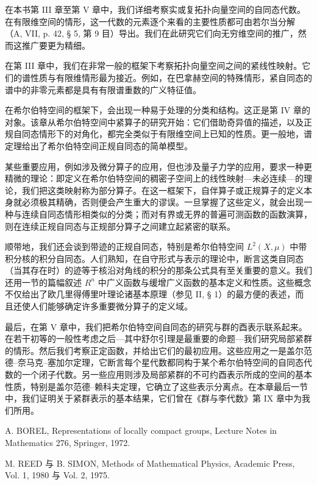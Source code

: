 
在本书第 III 章至第 V 章中，我们详细考察实或复拓扑向量空间的自同态代数。在有限维空间的情形，这一代数的元素逐个来看的主要性质都可由若尔当分解（A, VII, p. 42, § 5, 第 9 目）导出。我们在此研究它们向无穷维空间的推广，然而这推广要更为精细。

在第 III 章中，我们在非常一般的框架下考察拓扑向量空间之间的紧线性映射。它们的谱性质与有限维情形最为接近。例如，在巴拿赫空间的特殊情形，紧自同态的谱中的非零元素都是具有有限谱重数的广义特征值。

在希尔伯特空间的框架下，会出现一种易于处理的分类和结构。这正是第 IV 章的对象。该章从希尔伯特空间中紧算子的研究开始：它们借助奇异值的描述，以及正规自同态情形下的对角化，都完全类似于有限维空间上已知的性质。更一般地，谱定理给出了希尔伯特空间正规自同态的简单模型。

某些重要应用，例如涉及微分算子的应用，但也涉及量子力学的应用，要求一种更精微的理论：即定义在希尔伯特空间的稠密子空间上的线性映射---未必连续---的理论，我们把这类映射称为部分算子。在这一框架下，自伴算子或正规算子的定义本身就必须极其精确，否则便会产生重大的谬误。一旦掌握了这些定义，就会出现一种与连续自同态情形相类似的分类；而对有界或无界的普遍可测函数的函数演算，则在连续正规自同态与正规部分算子之间建立起紧密的联系。

顺带地，我们还会谈到带迹的正规自同态，特别是希尔伯特空间 \(L^{2}(X,\mu)\) 中带积分核的积分自同态。人们熟知，在自守形式与表示的理论中，断言这类自同态（当其存在时）的迹等于核沿对角线的积分的那条公式具有至关重要的意义。我们还用一节的篇幅叙述 \(R^{n}\) 中广义函数与缓增广义函数的基本定义和性质。这些概念不仅给出了欧几里得傅里叶理论诸基本原理（参见 II, § 1）的最方便的表述，而且还使人们能够确定许多重要微分算子的定义域。

最后，在第 V 章中，我们把希尔伯特空间自同态的研究与群的酉表示联系起来。在若干初等的一般性考虑之后---其中舒尔引理是最重要的命题---我们研究局部紧群的情形。然后我们考察正定函数，并给出它们的最初应用。这些应用之一是盖尔范德--奈马克--塞加尔定理，它断言每个星代数都同构于某个希尔伯特空间的自同态代数的一个闭子代数。另一些应用则涉及局部紧群的不可约酉表示所成的空间的基本性质，特别是盖尔范德--赖科夫定理，它确立了这些表示分离点。在本章最后一节中，我们证明关于紧群表示的基本结果，它们曾在《群与李代数》第 IX 章中为我们所用。

A. BOREL, Representations of locally compact groups, Lecture Notes in Mathematics 276, Springer, 1972.

M. REED 与 B. SIMON, Methods of Mathematical Physics, Academic Press, Vol. 1, 1980 与 Vol. 2, 1975.

